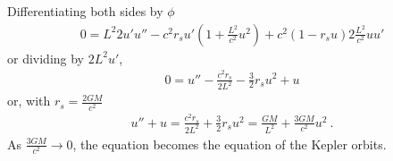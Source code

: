 \documentclass[letterpaper,10pt,english]{jupyterBook}
\begin{document}
\sphinxAtStartPar
Differentiating both sides by \(\phi\)
\begin{equation*}
\begin{split}0 = L^2 2 u' u'' - c^2 r_s u' \left( 1 + \frac{L^2}{c^2} u^2 \right) + c^2 ( 1 - r_s u) 2 \frac{L^2}{c^2} u u' \end{split}
\end{equation*}
\sphinxAtStartPar
or dividing by \(2 L^2 u'\),
\begin{equation*}
\begin{split}0 = u'' - \frac{c^2 r_s}{2 L^2} - \frac{3}{2}r_s u^2 + u\end{split}
\end{equation*}
\sphinxAtStartPar
or, with \(r_s = \frac{2 GM}{c^2}\)
\begin{equation*}
\begin{split}u'' + u = \frac{c^2 r_s}{2 L^2} + \frac{3}{2} r_s u^2 = \frac{GM}{L^2} + \frac{3 GM}{c^2} u^2 \ .\end{split}
\end{equation*}
\sphinxAtStartPar
{} As \(\frac{3 GM}{c^2} \to 0\), the equation becomes the equation of the Kepler orbits.
\end{document}
